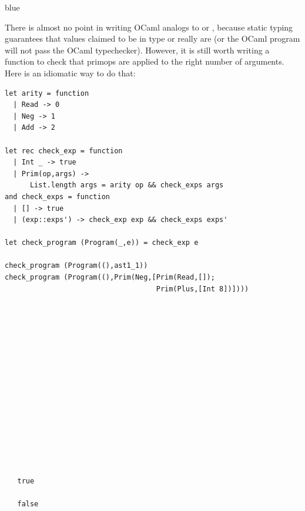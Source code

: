 \documentclass[11pt]{book}
\newenvironment{ocamlx}{
  \begin{color}{blue}
}
{
  \end{color}
}
\begin{document}
\begin{ocamlx}
There is almost no point in writing OCaml analogs to  or , because static
  typing guarantees that values claimed to be in type  or  really are
  (or the OCaml program will not pass the OCaml typechecker).  However, it is still worth
  writing a function to check that primops are applied to the right number of arguments.
  Here is an idiomatic way to do that:

\begin{center}
\begin{minipage}{0.85\textwidth}
\begin{lstlisting}[style=ocaml]
let arity = function 
  | Read -> 0
  | Neg -> 1
  | Add -> 2    

let rec check_exp = function 
  | Int _ -> true
  | Prim(op,args) ->
      List.length args = arity op && check_exps args
and check_exps = function
  | [] -> true
  | (exp::exps') -> check_exp exp && check_exps exps'

let check_program (Program(_,e)) = check_exp e

check_program (Program((),ast1_1))
check_program (Program((),Prim(Neg,[Prim(Read,[]);
                                    Prim(Plus,[Int 8])])))
\end{lstlisting}
\end{minipage}
\vrule
\begin{minipage}{0.1\textwidth}
\begin{lstlisting}[style=ocaml]






  








   true

   false
\end{lstlisting}
\end{minipage}
\end{center}


\end{ocamlx}
\end{document}
